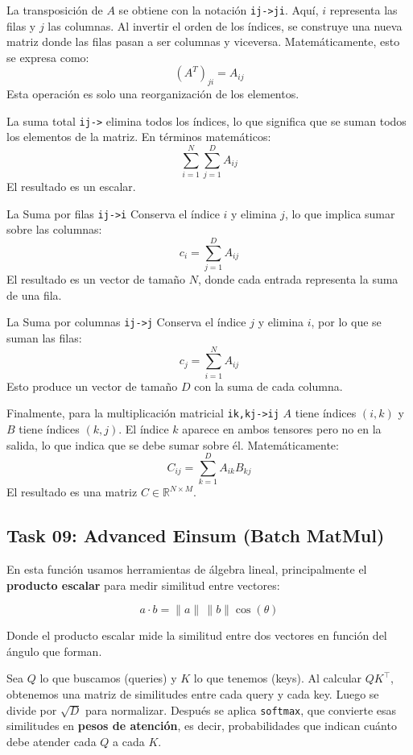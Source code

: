 ﻿\documentclass[12pt]{article}
\begin{document}
La transposición de $A$ se obtiene con la notación \texttt{ij->ji}. Aquí, $i$ representa las filas y $j$ las columnas. Al invertir el orden de los índices, se construye una nueva matriz donde las filas pasan a ser columnas y viceversa. Matemáticamente, esto se expresa como:
$$
    (A^T)_{ji} = A_{ij}
$$
Esta operación es solo una reorganización de los elementos.


La suma total \texttt{ij->} elimina todos los índices, lo que significa que se suman todos los elementos de la matriz. En términos matemáticos:
$$
    \sum_{i=1}^{N} \sum_{j=1}^{D} A_{ij}
$$
El resultado es un escalar.


La Suma por filas \texttt{ij->i} Conserva el índice $i$ y elimina $j$, lo que implica sumar sobre las columnas:
    $$
        c_i = \sum_{j=1}^{D} A_{ij}
    $$
El resultado es un vector de tamaño $N$, donde cada entrada representa la suma de una fila.

La Suma por columnas \texttt{ij->j} Conserva el índice $j$ y elimina $i$, por lo que se suman las filas:
    $$
        c_j = \sum_{i=1}^{N} A_{ij}
    $$
Esto produce un vector de tamaño $D$ con la suma de cada columna.



Finalmente, para la multiplicación matricial \texttt{ik,kj->ij} $A$ tiene índices $(i,k)$ y $B$ tiene índices $(k,j)$. El índice $k$ aparece en ambos tensores pero no en la salida, lo que indica que se debe sumar sobre él. Matemáticamente:
$$
    C_{ij} = \sum_{k=1}^{D} A_{ik} B_{kj}
$$
El resultado es una matriz $C \in \mathbb{R}^{N \times M}$. 

\subsection*{Task 09: Advanced Einsum (Batch MatMul)}

En esta función usamos herramientas de álgebra lineal, principalmente el \textbf{producto escalar} para medir similitud entre vectores:


\[
a \cdot b = \|a\| \, \|b\| \cos(\theta)
\]


Donde el producto escalar mide la similitud entre dos vectores en función del ángulo que forman.

Sea $Q$ lo que buscamos (queries) y $K$ lo que tenemos (keys). Al calcular $QK^{\top}$, obtenemos una matriz de similitudes entre cada query y cada key. Luego se divide por $\sqrt{D}$ para normalizar. Después se aplica \texttt{softmax}, que convierte esas similitudes en \textbf{pesos de atención}, es decir, probabilidades que indican cuánto debe atender cada $Q$ a cada $K$.
\end{document}
